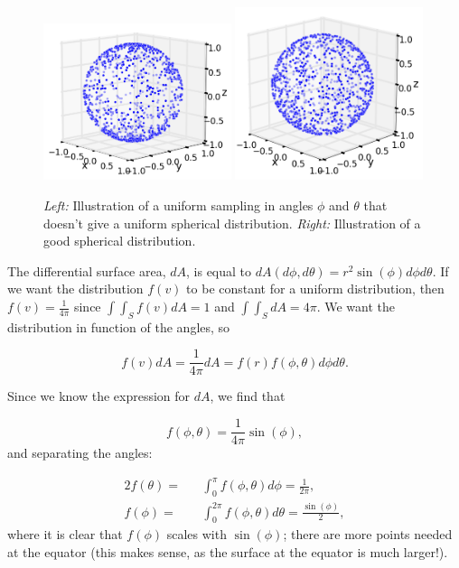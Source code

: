 \begin{appendices}
\begin{figure}
\centering
\includegraphics[width=0.49\textwidth]{appendix/img/badrandom.png}
\includegraphics[width=0.49\textwidth]{appendix/img/goodrandom.png}
\caption{\textit{Left: }Illustration of a uniform sampling in angles $\phi$ and $\theta$ that doesn't give a uniform spherical distribution. \textit{Right: }Illustration of a good spherical distribution.}
\label{fig:sphere}
\end{figure}

\noindent The differential surface area, $dA$, is equal to $dA(d\phi,d\theta) = r^2 \sin(\phi) d\phi d\theta$. If we want the distribution $f(v)$ to be constant for a uniform distribution, then $f(v) = \frac{1}{4\pi}$ since $\int \int_S f(v)dA = 1$ and $\int \int_S dA = 4\pi$. We want the distribution in function of the angles, so

\begin{equation}
f(v)dA = \frac{1}{4\pi} dA = f(r) f(\phi,\theta)d\phi d\theta.
\end{equation}

\noindent Since we know the expression for $dA$, we find that

\begin{equation}
f(\phi,\theta) = \frac{1}{4\pi} \sin(\phi),
\end{equation}
and separating the angles:

\begin{alignat}{2}
f(\theta) =&& \int^\pi_0 f(\phi,\theta)d\phi = \frac{1}{2\pi}, \\
f(\phi)   =&& \int^{2\pi}_0 f(\phi,\theta)d\theta = \frac{\sin(\phi)}{2},
\end{alignat}
\noindent where it is clear that $f(\phi)$ scales with $\sin(\phi)$; there are more points needed at the equator (this makes sense, as the surface at the equator is much larger!).\\


\end{appendices}
